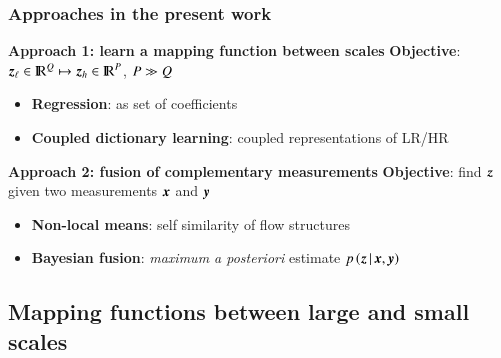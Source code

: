 \documentclass{beamer}
\let\olditem\item
\renewcommand{\item}{\setlength{\itemsep}{\fill}\olditem}
\begin{document}
\begin{frame}
\frametitle{Approaches in the present work}	
	\begin{block}{\textbf{Approach 1: learn a mapping function between scales}}
	\textbf{Objective}: $ \operatorname{\boldsymbol{z}}_\ell \in {\rm I\!R}^Q \mapsto  \operatorname{\boldsymbol{z}}_h \in {\rm I\!R}^P $, $ P \gg Q$ 
		\begin{itemize}
			\item \textbf{\color{red} Regression}: as set of coefficients\\
			\item \textbf{\color{red} Coupled dictionary learning}: coupled representations of LR/HR\\
		\end{itemize}
	\end{block}
	\vfill
	\begin{block}{\textbf{Approach 2: fusion of complementary measurements}}
	\textbf{Objective}: find $ \operatorname{\boldsymbol{z}}$ given two measurements $ \operatorname{\boldsymbol{x}}$ and $ \operatorname{\boldsymbol{y}}$
		\begin{itemize}
			\item \textbf{\color{red} Non-local means}: self similarity of flow structures\\
			\item \textbf{\color{red} Bayesian fusion}: \textit{maximum a posteriori} estimate $p \left(\operatorname{\boldsymbol{z}}|\operatorname{\boldsymbol{x}},\operatorname{\boldsymbol{y}}\right)$	
		\end{itemize}
	\end{block}	
\end{frame}


\subsection{Mapping functions between large and small scales}
\end{document}
